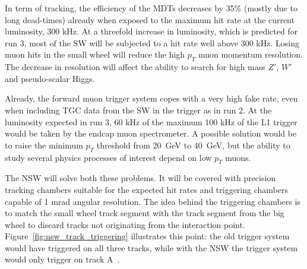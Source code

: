 In term of tracking, the efficiency of the MDTs decreases by 35\% (mostly due to long dead-times) already when exposed to the maximum hit rate at the current luminosity, 300 kHz.
At a threefold increase in luminosity, which is predicted for run 3, most of the SW will be subjected to a hit rate well above 300 kHz. Losing muon hits in the small wheel will reduce the high $p_T$ muon momentum resolution. The decrease in resolution will affect the ability to search for high mass $Z'$, $W'$ and pseudo-scalar Higgs.

Already, the forward muon trigger system copes with a very high fake rate, even when including TGC data from the SW in the trigger as in run 2. At the luminosity expected in run 3, 60 kHz of the maximum 100 kHz of the L1 trigger would be taken by the endcap muon spectrometer. A possible solution would be to raise the minimum $p_T$ threshold from \SI{20}{\giga\electronvolt} to \SI{40}{\giga\electronvolt}, but the ability to study several physics processes of interest depend on low $p_T$ muons.

The NSW will solve both these problems. It will be covered with precision tracking chambers suitable for the expected hit rates and triggering chambers capable of 1 mrad angular resolution. The idea behind the triggering chambers is to match the small wheel track segment with the track segment from the big wheel to discard tracks not originating from the interaction point. Figure~\ref{fig:nsw_track_triggering} illustrates this point: the old trigger system would have triggered on all three tracks, while with the NSW the trigger system would only trigger on track A~\cite{nsw_tdr}.


